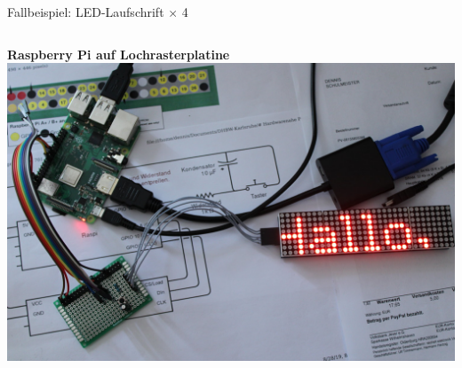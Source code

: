 {\begin{frame}{Fallbeispiel: LED-Laufschrift $\times$ 4}
\begin{columns}
        \textbf{Raspberry Pi auf Lochrasterplatine}
        \includegraphics[width=.9\textwidth]{img/laufschrift_pi2}
    \end{columns}
\end{frame}
}

